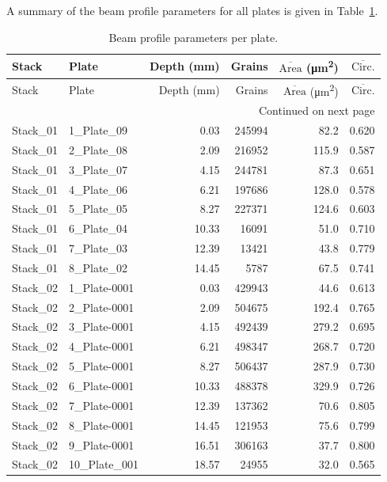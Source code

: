 \documentclass[12pt,a4paper]{article}
\begin{document}
A summary of the beam profile parameters for all plates is given in
Table~\ref{tab:beamprofile}.

\begin{longtable}{llrrrr}
\caption{Beam profile parameters per plate.}
\label{tab:beamprofile}\\
\toprule
Stack & Plate & Depth (mm) & Grains & $\overline{\text{Area}}$ (\si{\micro\meter\squared}) & $\overline{\text{Circ.}}$ \\
\midrule
\endfirsthead
\toprule
Stack & Plate & Depth (mm) & Grains & $\overline{\text{Area}}$ (\si{\micro\meter\squared}) & $\overline{\text{Circ.}}$ \\
\midrule
\endhead
\midrule \multicolumn{6}{r}{Continued on next page} \\
\endfoot
\bottomrule
\endlastfoot
Stack\_01 & 1\_Plate\_09 & 0.03 & 245994 & 82.2 & 0.620 \\
Stack\_01 & 2\_Plate\_08 & 2.09 & 216952 & 115.9 & 0.587 \\
Stack\_01 & 3\_Plate\_07 & 4.15 & 244781 & 87.3 & 0.651 \\
Stack\_01 & 4\_Plate\_06 & 6.21 & 197686 & 128.0 & 0.578 \\
Stack\_01 & 5\_Plate\_05 & 8.27 & 227371 & 124.6 & 0.603 \\
Stack\_01 & 6\_Plate\_04 & 10.33 & 16091 & 51.0 & 0.710 \\
Stack\_01 & 7\_Plate\_03 & 12.39 & 13421 & 43.8 & 0.779 \\
Stack\_01 & 8\_Plate\_02 & 14.45 & 5787 & 67.5 & 0.741 \\
Stack\_02 & 1\_Plate-0001 & 0.03 & 429943 & 44.6 & 0.613 \\
Stack\_02 & 2\_Plate-0001 & 2.09 & 504675 & 192.4 & 0.765 \\
Stack\_02 & 3\_Plate-0001 & 4.15 & 492439 & 279.2 & 0.695 \\
Stack\_02 & 4\_Plate-0001 & 6.21 & 498347 & 268.7 & 0.720 \\
Stack\_02 & 5\_Plate-0001 & 8.27 & 506437 & 287.9 & 0.730 \\
Stack\_02 & 6\_Plate-0001 & 10.33 & 488378 & 329.9 & 0.726 \\
Stack\_02 & 7\_Plate-0001 & 12.39 & 137362 & 70.6 & 0.805 \\
Stack\_02 & 8\_Plate-0001 & 14.45 & 121953 & 75.6 & 0.799 \\
Stack\_02 & 9\_Plate-0001 & 16.51 & 306163 & 37.7 & 0.800 \\
Stack\_02 & 10\_Plate\_001 & 18.57 & 24955 & 32.0 & 0.565 \\

\end{longtable}
\end{document}
